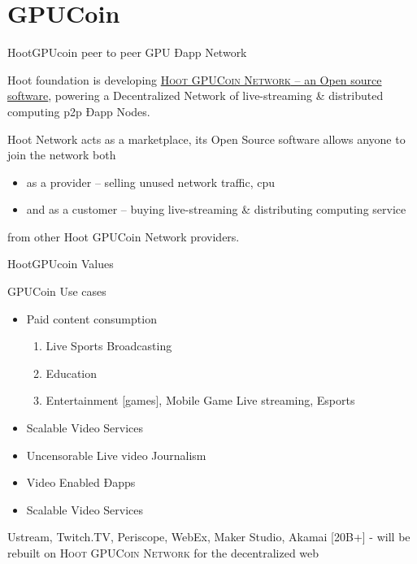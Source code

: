 \documentclass[10pt,handout]{beamer}
\begin{document}
\section{GPUCoin}
\begin{frame}[fragile]{HootGPUcoin peer to peer GPU Ðapp Network }

 Hoot foundation is developing \href{https://onhoot.com/tokensale}{\textsc{Hoot GPUCoin Network} – an Open source software}, powering a Decentralized Network of live-streaming \& distributed computing p2p Ðapp Nodes.
 

Hoot Network acts as a marketplace, its Open Source software allows anyone to join the network both 

\begin{itemize}
\item as a provider – selling unused network traffic, cpu
\item and as a customer – buying live-streaming \& distributing computing service
\end{itemize}
 from other Hoot GPUCoin Network providers. 
\end{frame}

\begin{frame}[t]{HootGPUcoin Values}


\end{frame}

\begin{frame}[fragile]{GPUCoin Use cases}
 \begin{itemize}[<+-| alert@+>]%
	 
\item {Paid content consumption}
\begin{enumerate}[<+-| alert@+>]
\item Live Sports Broadcasting
\item Education 
\item Entertainment [games], Mobile Game Live streaming, Esports
\end{enumerate}
\item {Scalable Video Services}
\item {Uncensorable Live video Journalism}
\item {Video Enabled Ðapps}
\item {Scalable Video Services}

\end{itemize}
\pause

\Large{
Ustream, Twitch.TV, Periscope, WebEx, Maker Studio, Akamai [20B+] - will be rebuilt on \textsc{Hoot GPUCoin Network} for the decentralized web
}

\end{frame}
\end{document}
